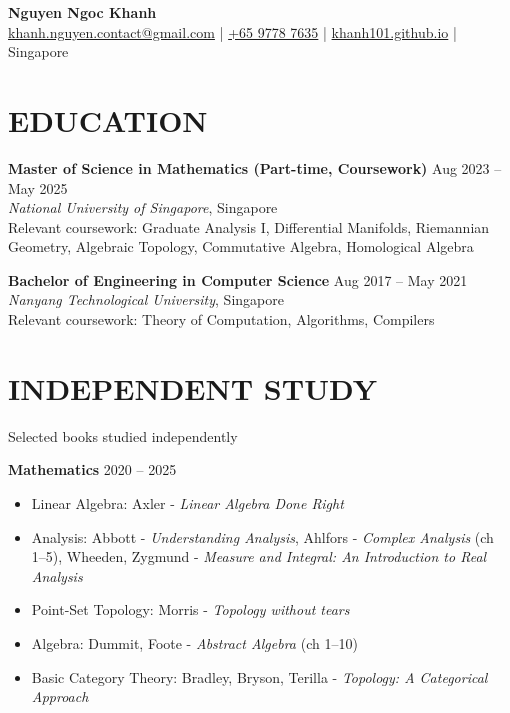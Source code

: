 \documentclass[11pt]{article}
\begin{document}
\begin{center}
    {\LARGE \textbf{Nguyen Ngoc Khanh}} \\
    \href{mailto:khanh.nguyen.contact@gmail.com}{khanh.nguyen.contact@gmail.com} | \href{tel:+6597787635}{+65 9778 7635} | \href{https://khanh101.github.io}{khanh101.github.io} | Singapore
\end{center}

\vspace{0.2cm}

\section*{EDUCATION}

\textbf{Master of Science in Mathematics (Part-time, Coursework)} \hfill Aug 2023 -- May 2025 \\
\textit{National University of Singapore}, Singapore \\
Relevant coursework: Graduate Analysis I, Differential Manifolds, Riemannian Geometry, Algebraic Topology, Commutative Algebra, Homological Algebra

\textbf{Bachelor of Engineering in Computer Science} \hfill Aug 2017 -- May 2021 \\
\textit{Nanyang Technological University}, Singapore \\
Relevant coursework: Theory of Computation, Algorithms, Compilers

\vspace{-0.3cm}
\section*{INDEPENDENT STUDY}

Selected books studied independently

\textbf{Mathematics} \hfill 2020 -- 2025 

\begin{itemize}[topsep=0pt, partopsep=0pt, itemsep=0pt, parsep=0pt]
	\item Linear Algebra: Axler - \textit{Linear Algebra Done Right}
	\item Analysis: Abbott - \textit{Understanding Analysis}, Ahlfors - \textit{Complex Analysis} (ch 1--5), Wheeden, Zygmund - \textit{Measure and Integral: An Introduction to Real Analysis}
	\item Point-Set Topology: Morris - \textit{Topology without tears}
	\item Algebra: Dummit, Foote - \textit{Abstract Algebra} (ch 1--10)
	\item Basic Category Theory: Bradley, Bryson, Terilla - \textit{Topology: A Categorical Approach}
\end{itemize}
\end{document}
